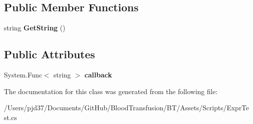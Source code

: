 \subsection*{Public Member Functions}
\begin{DoxyCompactItemize}
\item 
string {\bfseries Get\+String} ()\hypertarget{class_b83_1_1_logic_expression_parser_1_1_delegate_string_a0543e6f7c89072b827dab4c9932bbe2c}{}\label{class_b83_1_1_logic_expression_parser_1_1_delegate_string_a0543e6f7c89072b827dab4c9932bbe2c}

\end{DoxyCompactItemize}
\subsection*{Public Attributes}
\begin{DoxyCompactItemize}
\item 
System.\+Func$<$ string $>$ {\bfseries callback}\hypertarget{class_b83_1_1_logic_expression_parser_1_1_delegate_string_a38adf113639aa2f2c564d3fd8d54cca2}{}\label{class_b83_1_1_logic_expression_parser_1_1_delegate_string_a38adf113639aa2f2c564d3fd8d54cca2}

\end{DoxyCompactItemize}


The documentation for this class was generated from the following file\+:\begin{DoxyCompactItemize}
\item 
/\+Users/pjd37/\+Documents/\+Git\+Hub/\+Blood\+Transfusion/\+B\+T/\+Assets/\+Scripts/Expr\+Test.\+cs\end{DoxyCompactItemize}
